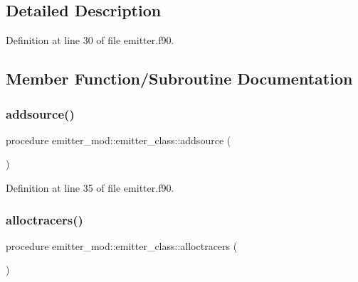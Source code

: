 \subsection{Detailed Description}


Definition at line 30 of file emitter.\+f90.



\subsection{Member Function/\+Subroutine Documentation}
\mbox{\label{structemitter__mod_1_1emitter__class_a162685b7b0bf96b555fee37e129c9783}} 
\subsubsection{\texorpdfstring{addsource()}{addsource()}}
{\footnotesize\ttfamily procedure emitter\+\_\+mod\+::emitter\+\_\+class\+::addsource (\begin{DoxyParamCaption}{ }\end{DoxyParamCaption})\hspace{0.3cm}{\ttfamily [private]}}



Definition at line 35 of file emitter.\+f90.

\mbox{\label{structemitter__mod_1_1emitter__class_a2e8c9f860c170e5ca3c33e801471c387}} 
\subsubsection{\texorpdfstring{alloctracers()}{alloctracers()}}
{\footnotesize\ttfamily procedure emitter\+\_\+mod\+::emitter\+\_\+class\+::alloctracers (\begin{DoxyParamCaption}{ }\end{DoxyParamCaption})\hspace{0.3cm}{\ttfamily [private]}}




